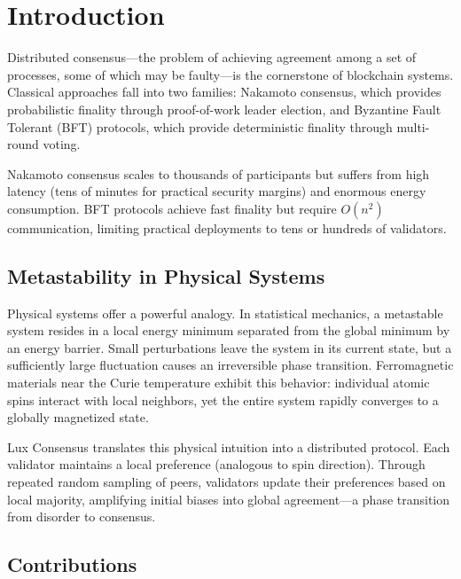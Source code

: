 \section{Introduction}

Distributed consensus---the problem of achieving agreement among a set of processes, some of which may be faulty---is the cornerstone of blockchain systems. Classical approaches fall into two families: Nakamoto consensus, which provides probabilistic finality through proof-of-work leader election, and Byzantine Fault Tolerant (BFT) protocols, which provide deterministic finality through multi-round voting.

Nakamoto consensus scales to thousands of participants but suffers from high latency (tens of minutes for practical security margins) and enormous energy consumption. BFT protocols achieve fast finality but require $O(n^2)$ communication, limiting practical deployments to tens or hundreds of validators.

\subsection{Metastability in Physical Systems}

Physical systems offer a powerful analogy. In statistical mechanics, a metastable system resides in a local energy minimum separated from the global minimum by an energy barrier. Small perturbations leave the system in its current state, but a sufficiently large fluctuation causes an irreversible phase transition. Ferromagnetic materials near the Curie temperature exhibit this behavior: individual atomic spins interact with local neighbors, yet the entire system rapidly converges to a globally magnetized state.

Lux Consensus translates this physical intuition into a distributed protocol. Each validator maintains a local preference (analogous to spin direction). Through repeated random sampling of peers, validators update their preferences based on local majority, amplifying initial biases into global agreement---a phase transition from disorder to consensus.

\subsection{Contributions}


